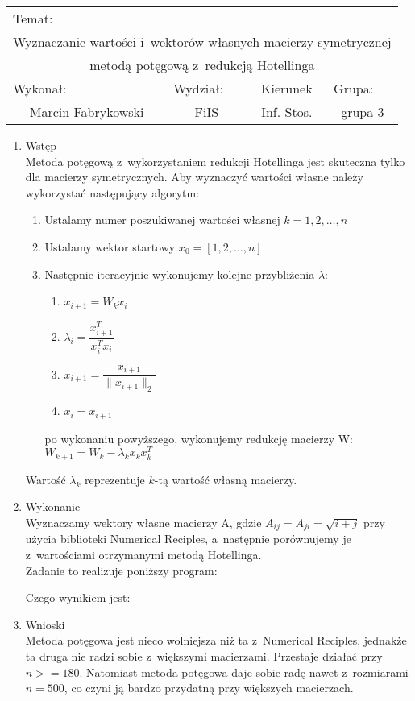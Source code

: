 \documentclass[12pt,a4paper]{article}
\begin{document}
 
\large
\begin{tabular}{|c|c|c|c|}
\hline
\multicolumn{4}{|l|}{Temat:}\\
\multicolumn{4}{|c|}{Wyznaczanie wartości i~wektorów własnych macierzy symetrycznej}\\
\multicolumn{4}{|c|}{metodą potęgową z~redukcją Hotellinga}\\
\hline
\multicolumn{1}{|l}{Wykonał:}&\multicolumn{1}{|l}{Wydział:}&\multicolumn{1}{|c}{Kierunek}&\multicolumn{1}{|l|}{Grupa:}\\
Marcin Fabrykowski&FiIS&Inf. Stos.&grupa 3\\
\hline
\end{tabular}
\normalsize
\vspace{2cm}
\begin{enumerate}
\item Wstęp\\
Metoda potęgową z~wykorzystaniem redukcji Hotellinga jest skuteczna tylko dla macierzy symetrycznych.
Aby wyznaczyć wartości własne należy wykorzystać następujący algorytm:
\begin{enumerate}
\item Ustalamy numer poszukiwanej wartości własnej $k=1,2,\dots,n$
\item Ustalamy wektor startowy $x_0=[1,2,\dots,n]$
\item Następnie iteracyjnie wykonujemy kolejne przybliżenia $\lambda$:
\begin{enumerate}
\item $x_{i+1}=W_kx_i$
\item $\lambda_i=\dfrac{x_{i+1}^T}{x_i^Tx_i}$
\item $x_{i+1}=\dfrac{x_{i+1}}{\|x_{i+1}\|_2}$
\item $x_i=x_{i+1}$
\end{enumerate}
po wykonaniu powyższego, wykonujemy redukcję macierzy W: $W_{k+1}=W_k-\lambda_kx_kx_k^T$
\end{enumerate}
Wartość $\lambda_k$ reprezentuje $k$-tą wartość własną macierzy.
\item Wykonanie\\
Wyznaczamy wektory własne macierzy A, gdzie $A_{ij}=A_{ji}=\sqrt{i+j}$ przy użycia biblioteki Numerical Reciples, a~następnie porównujemy je z~wartościami otrzymanymi metodą Hotellinga.\\
Zadanie to realizuje poniższy program:

Czego wynikiem jest:\\
\footnotesize

\normalsize
\item Wnioski\\
Metoda potęgowa jest nieco wolniejsza niż ta z~Numerical Reciples, jednakże ta druga nie radzi sobie z~większymi macierzami. Przestaje działać przy $n>=180$. Natomiast metoda potęgowa daje sobie radę nawet z~rozmiarami $n=500$, co czyni ją bardzo przydatną przy większych macierzach.
\end{enumerate}
\end{document}
